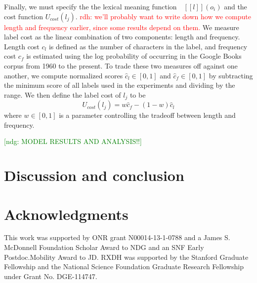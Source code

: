 \documentclass[10pt,letterpaper]{article}
\newcommand{\red}[1]{\textcolor{Red}{#1}}
\newcommand{\ndg}[1]{\textcolor{Green}{[ndg: #1]}}
\newcommand{\denote}[1]{\mbox{ $[\![ #1 ]\!]$}}
\begin{document}
Finally, we must specify the the lexical meaning function $\denote{l}(o_i)$ and the cost function $U_{cost}(l_j)$. 
\red{rdh: we'll probably want to write down how we compute length and frequency earlier, since some results depend on them.}
We measure label cost as the linear combination of two components: length and frequency. Length cost $c_l$ is defined as the number of characters in the label, and frequency cost $c_f$ is estimated using the log probability of occurring in the Google Books corpus from 1960 to the present. To trade these two measures off against one another, we compute normalized scores $\hat{c}_l \in [0,1]$ and $\hat{c}_f \in [0,1]$ by subtracting the minimum score of all labels used in the experiments and dividing by the range. We then define the label cost of $l_j$ to be $$U_{cost}(l_j) = w\hat{c}_f - (1-w)\hat{c}_l$$ where $w \in [0,1]$ is a parameter controlling the tradeoff between length and frequency.


\ndg{MODEL RESULTS AND ANALYSIS!!}


\section{\bf Discussion and conclusion}

\section{\bf Acknowledgments}

This work was supported by ONR grant N00014-13-1-0788 and a James S. McDonnell Foundation Scholar Award to NDG and an SNF Early Postdoc.Mobility Award to JD. RXDH was supported by the Stanford Graduate Fellowship and the National Science Foundation Graduate Research Fellowship under Grant No. DGE-114747.

\small




\setlength{\bibleftmargin}{.125in}
\setlength{\bibindent}{-\bibleftmargin}


\end{document}
